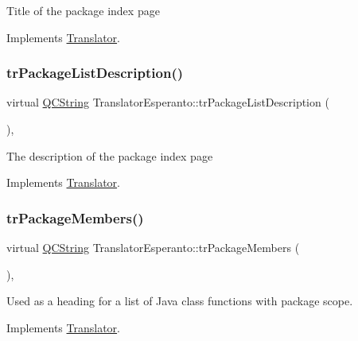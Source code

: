 Title of the package index page 

Implements \mbox{\hyperlink{class_translator}{Translator}}.

\mbox{\label{class_translator_esperanto_ab1d738264efc454a6f73e25dc4d40660}} 
\subsubsection{\texorpdfstring{trPackageListDescription()}{trPackageListDescription()}}
{\footnotesize\ttfamily virtual \mbox{\hyperlink{class_q_c_string}{Q\+C\+String}} Translator\+Esperanto\+::tr\+Package\+List\+Description (\begin{DoxyParamCaption}{ }\end{DoxyParamCaption})\hspace{0.3cm}{\ttfamily [inline]}, {\ttfamily [virtual]}}

The description of the package index page 

Implements \mbox{\hyperlink{class_translator}{Translator}}.

\mbox{\label{class_translator_esperanto_a60a90b290145c50a6adea83a564394fb}} 
\subsubsection{\texorpdfstring{trPackageMembers()}{trPackageMembers()}}
{\footnotesize\ttfamily virtual \mbox{\hyperlink{class_q_c_string}{Q\+C\+String}} Translator\+Esperanto\+::tr\+Package\+Members (\begin{DoxyParamCaption}{ }\end{DoxyParamCaption})\hspace{0.3cm}{\ttfamily [inline]}, {\ttfamily [virtual]}}

Used as a heading for a list of Java class functions with package scope. 

Implements \mbox{\hyperlink{class_translator}{Translator}}.

\mbox{\label{class_translator_esperanto_a40962b94c0d1e5a79680402fc626cd65}} 
